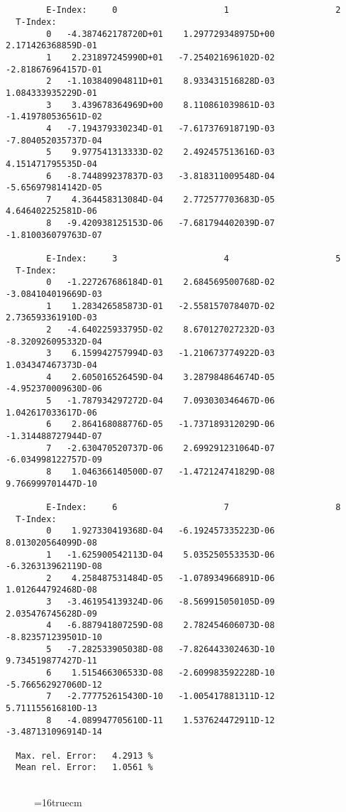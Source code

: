 \documentclass[12pt]{article}
\begin{document}
\begin{small}\begin{verbatim}


        E-Index:     0                     1                     2
  T-Index:
        0   -4.387462178720D+01    1.297729348975D+00    2.171426368859D-01
        1    2.231897245990D+01   -7.254021696102D-02   -2.818676964157D-01
        2   -1.103840904811D+01    8.933431516828D-03    1.084333935229D-01
        3    3.439678364969D+00    8.110861039861D-03   -1.419780536561D-02
        4   -7.194379330234D-01   -7.617376918719D-03   -7.804052035737D-04
        5    9.977541313333D-02    2.492457513616D-03    4.151471795535D-04
        6   -8.744899237837D-03   -3.818311009548D-04   -5.656979814142D-05
        7    4.364458313084D-04    2.772577703683D-05    4.646402252581D-06
        8   -9.420938125153D-06   -7.681794402039D-07   -1.810036079763D-07

        E-Index:     3                     4                     5
  T-Index:
        0   -1.227267686184D-01    2.684569500768D-02   -3.084104019669D-03
        1    1.283426585873D-01   -2.558157078407D-02    2.736593361910D-03
        2   -4.640225933795D-02    8.670127027232D-03   -8.320926095332D-04
        3    6.159942757994D-03   -1.210673774922D-03    1.034347467373D-04
        4    2.605016526459D-04    3.287984864674D-05   -4.952370009630D-06
        5   -1.787934297272D-04    7.093030346467D-06    1.042617033617D-06
        6    2.864168088776D-05   -1.737189312029D-06   -1.314488727944D-07
        7   -2.630470520737D-06    2.699291231064D-07   -6.034998122757D-09
        8    1.046366140500D-07   -1.472124741829D-08    9.766999701447D-10

        E-Index:     6                     7                     8
  T-Index:
        0    1.927330419368D-04   -6.192457335223D-06    8.013020564099D-08
        1   -1.625900542113D-04    5.035250553353D-06   -6.326313962119D-08
        2    4.258487531484D-05   -1.078934966891D-06    1.012644792468D-08
        3   -3.461954139324D-06   -8.569915050105D-09    2.035476745628D-09
        4   -6.887941807259D-08    2.782454606073D-08   -8.823571239501D-10
        5   -7.282533905038D-08   -7.826443302463D-10    9.734519877427D-11
        6    1.515466306533D-08   -2.609983592228D-10   -5.766562927060D-12
        7   -2.777752615430D-10   -1.005417881311D-12    5.711155616810D-13
        8   -4.089947705610D-11    1.537624472911D-12   -3.487131096914D-14

  Max. rel. Error:   4.2913 %
  Mean rel. Error:   1.0561 %


\end{verbatim}\end{small}
\begin{figure} \label{2.2d}
\epsfxsize=16truecm
\end{figure}
\newpage
\end{document}
